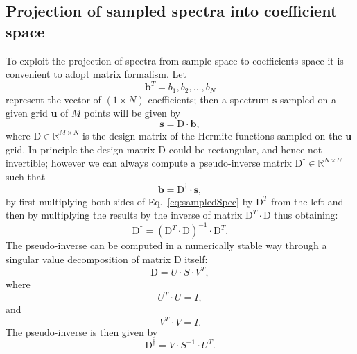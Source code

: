 \documentclass{aa}
\newcommand{\equref}[1]{Eq.~\ref{eq:#1}}
\begin{document}
\begin{appendix}
\section{Projection of sampled spectra into coefficient space}\label{sec:projCoeffs}

To exploit the projection of spectra from sample space to  coefficients space it is convenient to adopt matrix formalism.
Let 
\begin{equation}
   \textbf{b}^T = {b_1, b_2, \dots, b_{N}}
\end{equation}
represent the vector of $(1\times N)$ coefficients; then a spectrum $\textbf{s}$ sampled on a given grid $\textbf{u}$ of $M$ points will be given by
\begin{equation}
    \textbf{s} = \mathrm{D} \cdot \textbf{b}
,\end{equation}
where $\mathrm{D}\! \in\mathbb{R}^{M\times N}$ is the design matrix of the Hermite functions sampled on the $\textbf{u}$ grid. In principle the design matrix D could be rectangular, and hence not invertible; however we can always compute a pseudo-inverse matrix $\mathrm{D}^\dagger\! \in\mathbb{R}^{N\times U}$ such that 
\begin{equation}
   \textbf{b} = \mathrm{D}^\dagger \cdot \textbf{s}
,\end{equation}
by first multiplying both sides of \equref{sampledSpec}  by $\mathrm{D}^T$ from the left and then by multiplying the results 
by the inverse of matrix $\mathrm{D}^T\cdot \mathrm{D}$ thus obtaining:
\begin{equation}
   \label{eq:pseudoInverse}
\mathrm{D}^\dagger = \left(\mathrm{D}^T\cdot \mathrm{D}\right)^{-1}\cdot \mathrm{D}^T
.\end{equation}
The pseudo-inverse can be computed in a numerically stable way through a singular value decomposition of matrix $\mathrm{D}$ itself:
\begin{equation}
    \mathrm{D} = U\cdot S\cdot V^T
,\end{equation}
where
\begin{equation}
    U^T\cdot U=I
,\end{equation}
and
\begin{equation}
    V^T\cdot V=I
.\end{equation}
The pseudo-inverse is then given by
\begin{equation}
    \mathrm{D}^\dagger = V\cdot S^{-1}\cdot U^T
.\end{equation}


\end{appendix}
\end{document}
